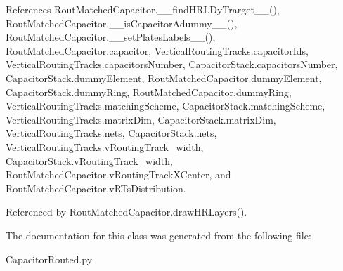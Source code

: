 References Rout\-Matched\-Capacitor.\-\_\-\-\_\-find\-H\-R\-L\-Dy\-Trarget\-\_\-\-\_\-(), Rout\-Matched\-Capacitor.\-\_\-\-\_\-is\-Capacitor\-Adummy\-\_\-\-\_\-(), Rout\-Matched\-Capacitor.\-\_\-\-\_\-set\-Plates\-Labels\-\_\-\-\_\-(), Rout\-Matched\-Capacitor.\-capacitor, Vertical\-Routing\-Tracks.\-capacitor\-Ids, Vertical\-Routing\-Tracks.\-capacitors\-Number, Capacitor\-Stack.\-capacitors\-Number, Capacitor\-Stack.\-dummy\-Element, Rout\-Matched\-Capacitor.\-dummy\-Element, Capacitor\-Stack.\-dummy\-Ring, Rout\-Matched\-Capacitor.\-dummy\-Ring, Vertical\-Routing\-Tracks.\-matching\-Scheme, Capacitor\-Stack.\-matching\-Scheme, Vertical\-Routing\-Tracks.\-matrix\-Dim, Capacitor\-Stack.\-matrix\-Dim, Vertical\-Routing\-Tracks.\-nets, Capacitor\-Stack.\-nets, Vertical\-Routing\-Tracks.\-v\-Routing\-Track\-\_\-width, Capacitor\-Stack.\-v\-Routing\-Track\-\_\-width, Rout\-Matched\-Capacitor.\-v\-Routing\-Track\-X\-Center, and Rout\-Matched\-Capacitor.\-v\-R\-Ts\-Distribution.



Referenced by Rout\-Matched\-Capacitor.\-draw\-H\-R\-Layers().



The documentation for this class was generated from the following file\-:\begin{DoxyCompactItemize}
\item 
Capacitor\-Routed.\-py\end{DoxyCompactItemize}
